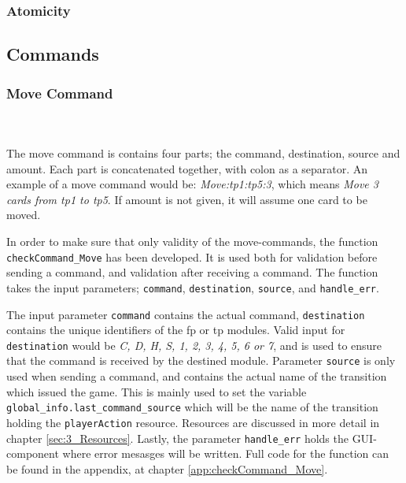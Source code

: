 \documentclass[runningheads,a4paper]{llncs}
\begin{document}
\subsubsection{Atomicity}
\clearpage
\subsection{Commands}
\subsubsection{Move Command}~\\~\\
\label{sec:3_move_command}
The move command is contains four parts; the command, destination, source and amount. Each part is concatenated together, with colon as a separator. An example of a move command would be: \textit{Move:\ac{tp}1:\ac{tp}5:3}, which means \textit{Move 3 cards from \ac{tp}1 to \ac{tp}5}. If amount is not given, it will assume one card to be moved.
\newline

In order to make sure that only validity of the move-commands, the function \verb!checkCommand_Move! has been developed. It is used both for validation before sending a command, and validation after receiving a command. The function takes the input parameters; \verb!command!, \verb!destination!, \verb!source!, and \verb!handle_err!. 
\newline

The input parameter \verb!command! contains the actual command, \verb!destination! contains the unique identifiers of the \ac{fp} or \ac{tp} modules. Valid input for \verb!destination! would be \textit{C, D, H, S, 1, 2, 3, 4, 5, 6 or 7}, and is used to ensure that the command is received by the destined module. Parameter \verb!source! is only used when sending a command, and contains the actual name of the transition which issued the game. This is mainly used to set the variable \verb!global_info.last_command_source! which will be the name of the transition holding the \verb!playerAction! resource. Resources are discussed in more detail in chapter \ref{sec:3_Resources}. Lastly, the parameter \verb!handle_err! holds the GUI-component where error mesasges will be written. Full code for the function can be found in the appendix, at chapter \ref{app:checkCommand_Move}.
\\
\end{document}
